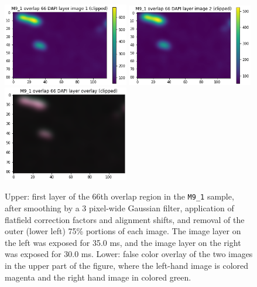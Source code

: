 \documentclass[letterpaper,11pt]{article}
\begin{document}
\begin{figure}[!ht]
\centering
\includegraphics[width=0.49\textwidth]{images/methods/smoothed_flatfielded_aligned_clipped_M9_1_overlap_66_dapi_image_1}
\includegraphics[width=0.49\textwidth]{images/methods/smoothed_flatfielded_aligned_clipped_M9_1_overlap_66_dapi_image_2}
\includegraphics[width=0.49\textwidth]{images/methods/smoothed_flatfielded_aligned_clipped_M9_1_overlap_66_dapi_overlay}
\caption{\footnotesize Upper: first layer of the 66th overlap region in the \texttt{M9\_1} sample, after smoothing by a 3 pixel-wide Gaussian filter, application of flatfield correction factors and alignment shifts, and removal of the outer (lower left) 75\% portions of each image. The image layer on the left was exposed for 35.0 ms, and the image layer on the right was exposed for 30.0 ms. Lower: false color overlay of the two images in the upper part of the figure, where the left-hand image is colored magenta and the right hand image in colored green.}
\label{fig:smoothed_flatfielded_aligned_clipped_M9_1_overlap_66}
\end{figure}
\end{document}
